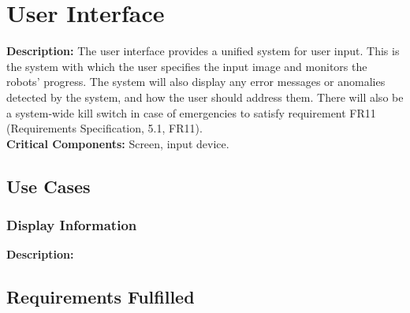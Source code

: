 
\section{User Interface}
\label{sec:user_interface}
\textbf{Description:} The user interface provides a unified system for user input. This is the system with which the user specifies the input image and monitors the robots' progress. The system will also display any error messages or anomalies detected by the system, and how the user should address them. There will also be a system-wide kill switch in case of emergencies to satisfy requirement FR11 (Requirements Specification, 5.1, FR11). \\

\noindent
\textbf{Critical Components:} Screen, input device. 

\subsection{Use Cases}
\subsubsection{Display Information}
\textbf{Description:} 

\subsection{Requirements Fulfilled}